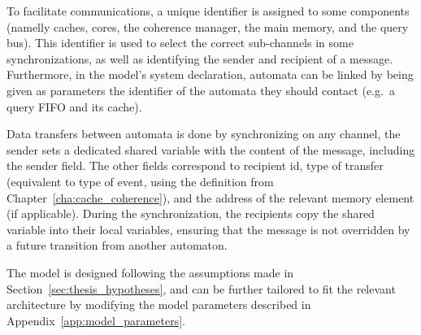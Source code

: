 To facilitate communications, a unique identifier is assigned to some components
(namelly caches, cores, the coherence manager, the main memory, and the query
bus). This identifier is used to select the correct sub-channels in some
synchronizations, as well as identifying the sender and recipient of a message.
Furthermore, in the model's system declaration, automata can be linked by being
given as parameters the identifier of the automata they should contact (e.g.~a
query FIFO and its cache).

Data transfers between automata is done by synchronizing on any channel, the
sender sets a dedicated shared variable with the content of the message,
including the sender field. The other fields correspond to recipient id, type of
transfer (equivalent to type of event, using the definition from
Chapter~\ref{cha:cache_coherence}), and the address of the relevant memory
element (if applicable). During the synchronization, the recipients copy the
shared variable into their local variables, ensuring that the message is not
overridden by a future transition from another automaton.

The model is designed following the assumptions made in
Section~\ref{sec:thesis_hypotheses}, and can be further tailored to fit the
relevant architecture by modifying the model parameters described in
Appendix~\ref{app:model_parameters}.
